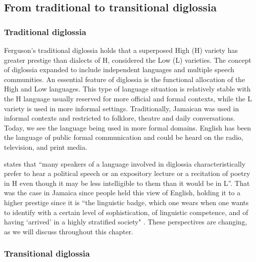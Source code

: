 \documentclass[output=paper,colorlinks,citecolor=brown]{langscibook}
\begin{document}
\subsection{From traditional to transitional diglossia}

\subsubsection{Traditional diglossia \citep{Ferguson1959}}

Ferguson’s traditional diglossia holds that a superposed High (H) variety has greater prestige than dialects of H, considered the Low (L) varieties. The concept of diglossia expanded to include independent languages and multiple speech communities. An essential feature of diglossia is the functional allocation of the High and Low languages. This type of language situation is relatively stable with the H language usually reserved for more official and formal contexts, while the L variety is used in more informal settings. Traditionally, Jamaican was used in informal contexts and restricted to folklore, theatre and daily conversations. Today, we see the language being used in more formal domains. English has been the language of public formal communication and could be heard on the radio, television, and print media. 

\citet[330]{Ferguson1959} states that “many speakers of a language involved in diglossia characteristically prefer to hear a political speech or an expository lecture or a recitation of poetry in H even though it may be less intelligible to them than it would be in L”. That was the case in Jamaica since people held this view of English, holding it to a higher prestige since it is “the linguistic badge, which one wears when one wants to identify with a certain level of sophistication, of linguistic competence, and of having ‘arrived’ in a highly stratified society" \citep[9]{PollardVelma1994}. These perspectives are changing, as we will discuss throughout this chapter.  


\subsubsection{Transitional diglossia} 
\end{document}
